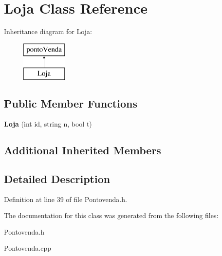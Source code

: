 \hypertarget{classLoja}{}\section{Loja Class Reference}
\label{classLoja}
Inheritance diagram for Loja\+:\begin{figure}[H]
\begin{center}
\leavevmode
\includegraphics[height=2.000000cm]{classLoja}
\end{center}
\end{figure}
\subsection*{Public Member Functions}
\begin{DoxyCompactItemize}
\item 
\mbox{\label{classLoja_a9546498e81156fee97a0ba2b2bb15ff2}} 
{\bfseries Loja} (int id, string n, bool t)
\end{DoxyCompactItemize}
\subsection*{Additional Inherited Members}


\subsection{Detailed Description}


Definition at line 39 of file Pontovenda.\+h.



The documentation for this class was generated from the following files\+:\begin{DoxyCompactItemize}
\item 
Pontovenda.\+h\item 
Pontovenda.\+cpp\end{DoxyCompactItemize}
